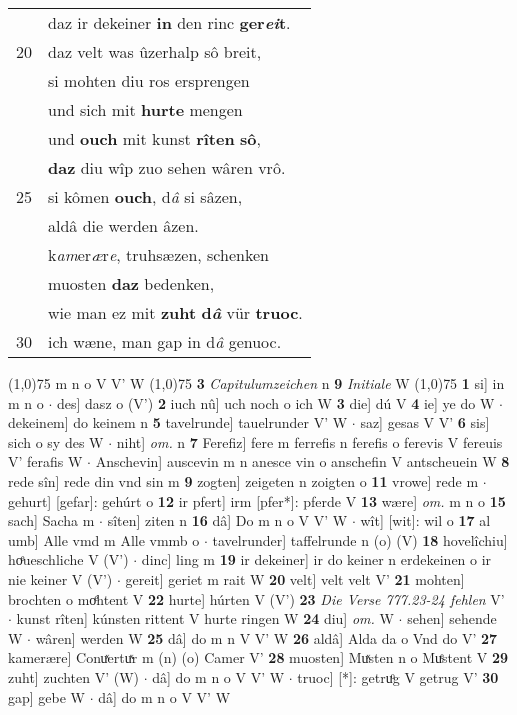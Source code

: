\documentclass[8pt,a4paper,notitlepage]{article}
\begin{document}
\begin{table}[ht]
\begin{minipage}[t]{0.5\linewidth}
\begin{tabular}{rl}
 & daz ir dekeiner \textbf{in} den rinc \textbf{ger\textit{ei}t}.\\ 
20 & daz velt was ûzerhalp sô breit,\\ 
 & si mohten diu ros ersprengen\\ 
 & und sich mit \textbf{hurte} mengen\\ 
 & und \textbf{ouch} mit kunst \textbf{rîten} \textbf{sô},\\ 
 & \textbf{daz} diu wîp zuo sehen wâren vrô.\\ 
25 & si kômen \textbf{ouch}, d\textit{â} si sâzen,\\ 
 & aldâ die werden âzen.\\ 
 & k\textit{am}er\textit{æ}r\textit{e}, truhsæzen, schenken\\ 
 & muosten \textbf{daz} bedenken,\\ 
 & wie man ez mit \textbf{zuht} \textbf{d\textit{â}} vür \textbf{truoc}.\\ 
30 & ich wæne, man gap in d\textit{â} genuoc.\\ 
\end{tabular}
\scriptsize
\line(1,0){75} \newline
m n o V V' W \newline
\line(1,0){75} \newline
\textbf{3} \textit{Capitulumzeichen} n  \textbf{9} \textit{Initiale} W  \newline
\line(1,0){75} \newline
\textbf{1} si] in m n o  $\cdot$ des] dasz o (V') \textbf{2} iuch nû] uch noch o ich W \textbf{3} die] dú V \textbf{4} ie] ye do W  $\cdot$ dekeinem] do keinem n \textbf{5} tavelrunde] tauelrunder V' W  $\cdot$ saz] gesas V V' \textbf{6} sis] sich o sy des W  $\cdot$ niht] \textit{om.} n \textbf{7} Ferefiz] fere m ferrefis n ferefis o ferevis V fereuis V' ferafis W  $\cdot$ Anschevin] auscevin m n anesce vin o anschefin V antscheuein W \textbf{8} rede sîn] rede din vnd sin m \textbf{9} zogten] zeigeten n zoigten o \textbf{11} vrowe] rede m  $\cdot$ gehurt] [gefar]: gehúrt o \textbf{12} ir pfert] irm [pfer*]: pferde V \textbf{13} wære] \textit{om.} m n o \textbf{15} sach] Sacha m  $\cdot$ sîten] ziten n \textbf{16} dâ] Do m n o V V' W  $\cdot$ wît] [wit]: wil o \textbf{17} al umb] Alle vmd m Alle vmmb o  $\cdot$ tavelrunder] taffelrunde n (o) (V) \textbf{18} hovelîchiu] hoͤueschliche V (V')  $\cdot$ dinc] ling m \textbf{19} ir dekeiner] ir do keiner n erdekeinen o ir nie keiner V (V')  $\cdot$ gereit] geriet m rait W \textbf{20} velt] velt velt V' \textbf{21} mohten] brochten o moͤhtent V \textbf{22} hurte] húrten V (V') \textbf{23} \textit{Die Verse 777.23-24 fehlen} V'   $\cdot$ kunst rîten] kúnsten rittent V hurte ringen W \textbf{24} diu] \textit{om.} W  $\cdot$ sehen] sehende W  $\cdot$ wâren] werden W \textbf{25} dâ] do m n V V' W \textbf{26} aldâ] Alda da o Vnd do V' \textbf{27} kamerære] Conuͯertuͯr m (n) (o) Camer V' \textbf{28} muosten] Muͯsten n o Muͤstent V \textbf{29} zuht] zuchten V' (W)  $\cdot$ dâ] do m n o V V' W  $\cdot$ truoc] [*]: getruͦg V getrug V' \textbf{30} gap] gebe W  $\cdot$ dâ] do m n o V V' W \newline

\end{minipage}
\end{table}
\end{document}
